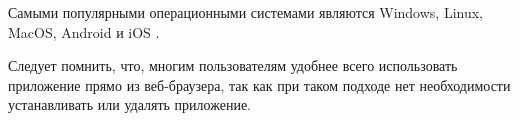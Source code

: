 Самыми популярными операционными системами являются Windows, Linux, MacOS, Android и iOS \cite{TopOperatingSystems}.

Следует помнить, что, многим пользователям удобнее всего использовать приложение прямо из веб-браузера, так как при таком подходе нет необходимости устанавливать или удалять приложение.
